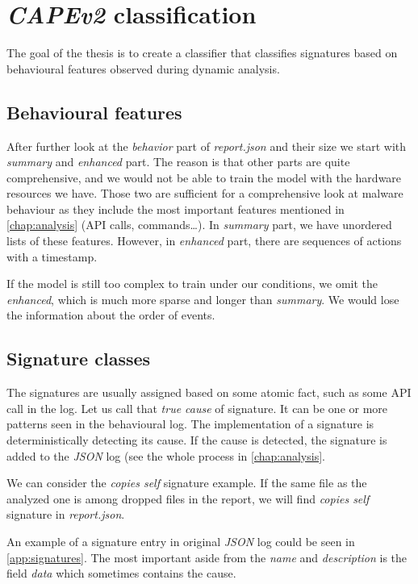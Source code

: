\section{\emph{CAPEv2} classification}
The goal of the thesis is to create a classifier that classifies signatures based on behavioural features observed during dynamic analysis.

\subsection{Behavioural features}
After further look at the \emph{behavior} part of \emph{report.json} and their size we start with \emph{summary} and \emph{enhanced} part. The reason is that other parts are quite comprehensive, and we would not be able to train the model with the hardware resources we have. Those two are sufficient for a comprehensive look at malware behaviour as they include the most important features mentioned in \ref{chap:analysis} (API calls, commands\dots). In \emph{summary} part, we have unordered lists of these features. However, in \emph{enhanced} part, there are sequences of actions with a timestamp.

If the model is still too complex to train under our conditions, we omit the \emph{enhanced}, which is much more sparse and longer than \emph{summary}. We would lose the information about the order of events.

\subsection{Signature classes}
The signatures are usually assigned based on some atomic fact, such as some API call in the log. Let us call that \emph{true cause} of signature. It can be one or more patterns seen in the behavioural log. The implementation of a signature is deterministically detecting its cause. If the cause is detected, the signature is added to the \emph{JSON} log (see the whole process in \ref{chap:analysis}.

We can consider the \emph{copies self} signature example. If the same file as the analyzed one is among dropped files in the report, we will find \emph{copies self} signature in \emph{report.json}.

An example of a signature entry in original \emph{JSON} log could be seen in \ref{app:signatures}. The most important aside from the \emph{name} and \emph{description} is the field \emph{data} which sometimes contains the cause.

